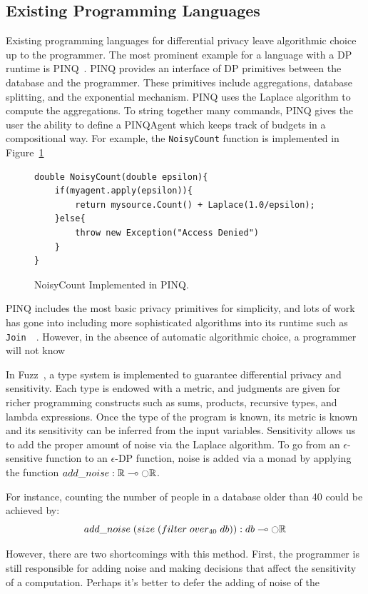 \documentclass[11pt]{report}
\renewcommand{\t}[1]{\texttt{#1}}
\begin{document}
\subsection{Existing Programming Languages}
Existing programming languages for differential privacy leave algorithmic choice up to the programmer. The most prominent example for a language with a DP runtime is PINQ~\cite{McSherry:2010}. PINQ provides an interface of DP primitives between the database and the programmer. These primitives include aggregations, database splitting, and the exponential mechanism. PINQ uses the Laplace algorithm to compute the aggregations. To string together many commands, PINQ gives the user the ability to define a PINQAgent which keeps track of budgets in a compositional way. For example, the \t{NoisyCount} function is implemented in Figure~\ref{fig:PINQNoisyCount}
\begin{figure}
\begin{verbatim}
double NoisyCount(double epsilon){
    if(myagent.apply(epsilon)){
        return mysource.Count() + Laplace(1.0/epsilon);
    }else{
        throw new Exception("Access Denied")
    }
}
\end{verbatim}
\caption{NoisyCount Implemented in PINQ.}
\label{fig:PINQNoisyCount}
\end{figure}
PINQ includes the most basic privacy primitives for simplicity, and lots of work has gone into including more sophisticated algorithms into its runtime such as \t{Join}~\cite{Proserpio:2014}~\cite{Johnson:2017}. However, in the absence of automatic algorithmic choice, a programmer will not know 

In Fuzz~\cite{Reed:2010}, a type system is implemented to guarantee differential privacy and sensitivity. Each type is endowed with a metric, and judgments are given for richer programming constructs such as sums, products, recursive types, and lambda expressions. Once the type of the program is known, its metric is known and its sensitivity can be inferred from the input variables. Sensitivity allows us to add the proper amount of noise via the Laplace algorithm. To go from an $\epsilon$-sensitive function to an $\epsilon$-DP function, noise is added via a monad by applying the function $add\_noise : \mathbb{R} \multimap \fullmoon\mathbb{R}$.

For instance, counting the number of people in a database older than 40 could be achieved by:
\[
add\_noise\;(size\;(filter\;over_{40}\;db)) : db \multimap \fullmoon\mathbb{R}
\]

However, there are two shortcomings with this method. First, the programmer is still responsible for adding noise and making decisions that affect the sensitivity of a computation. Perhaps it's better to defer the adding of noise of the 
\end{document}

